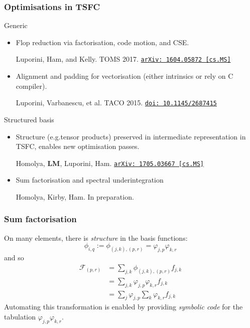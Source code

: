 \documentclass[presentation]{beamer}
\newcommand{\arxivlink}[2]{%
  \href{http://www.arxiv.org/abs/#1}%
  {\texttt{arXiv:\,#1\,[#2]}}%
}
\newcommand{\doilink}[1]{%
  \href{http://dx.doi.org/#1}%
  {\texttt{doi:\,#1}}%
}
\begin{document}
\begin{frame}
  \frametitle{Optimisations in TSFC}
  \begin{block}{Generic}
    \begin{itemize}
    \item Flop reduction via factorisation, code motion, and CSE.
      \begin{flushright}
        {\scriptsize
        Luporini, Ham, and Kelly.  TOMS
        2017. \arxivlink{1604.05872}{cs.MS}\nocite{Luporini:2017}}
      \end{flushright}
    \item Alignment and padding for vectorisation (either intrinsics
      or rely on C compiler).
      \begin{flushright}
        {\scriptsize
        Luporini, Varbanescu, et al. TACO
        2015. \doilink{10.1145/2687415}\nocite{Luporini:2015}}
      \end{flushright}
    \end{itemize}
  \end{block}
  \begin{block}{Structured basis}
    \begin{itemize}
    \item Structure (e.g.\@ tensor products) preserved in intermediate
      representation in TSFC, enables new optimisation passes.
      \begin{flushright}
        {\scriptsize Homolya, \textbf{LM}, Luporini, Ham. \arxivlink{1705.03667}{cs.MS}\nocite{Homolya:2017}}
      \end{flushright}
    \item Sum factorisation and spectral underintegration
      \begin{flushright}
        {\scriptsize Homolya, Kirby, Ham. In preparation.}
      \end{flushright}
    \end{itemize}
  \end{block}
\end{frame}

\begin{frame}
  \frametitle{Sum factorisation}
  On many elements, there is \emph{structure} in the basis functions:
  \begin{equation*}
    \phi_{i,q} := \phi_{(j,k),(p,r)} = \varphi_{j,p}\varphi_{k,r}
  \end{equation*}
  and so
  \begin{align*}
    \mathcal{F}_{(p,r)} &= \sum_{j,k} \phi_{(j,k),(p,r)} f_{j,k} \\
                        &= \sum_{j,k} \varphi_{j,p}\varphi_{k,r} f_{j,k} \\
                        &= \sum_j \varphi_{j,p} \sum_k \varphi_{k,r} f_{j,k}
  \end{align*}
  Automating this transformation is enabled by providing
  \emph{symbolic code} for the tabulation
  $\varphi_{j,p}\varphi_{k,r}$.
\end{frame}
\end{document}

